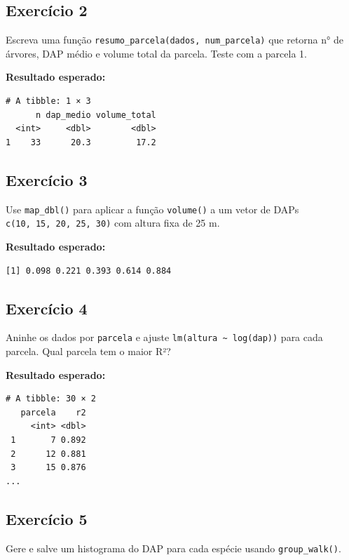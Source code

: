 \documentclass[
  letterpaper,
]{scrbook}
\begin{document}
\subsection{Exercício 2}\label{exercuxedcio-2-13}

Escreva uma função \texttt{resumo\_parcela(dados,\ num\_parcela)} que
retorna n° de árvores, DAP médio e volume total da parcela. Teste com a
parcela 1.

\textbf{Resultado esperado:}

\begin{verbatim}
# A tibble: 1 × 3
      n dap_medio volume_total
  <int>     <dbl>        <dbl>
1    33      20.3         17.2
\end{verbatim}

\subsection{Exercício 3}\label{exercuxedcio-3-12}

Use \texttt{map\_dbl()} para aplicar a função \texttt{volume()} a um
vetor de DAPs \texttt{c(10,\ 15,\ 20,\ 25,\ 30)} com altura fixa de 25
m.

\textbf{Resultado esperado:}

\begin{verbatim}
[1] 0.098 0.221 0.393 0.614 0.884
\end{verbatim}

\subsection{Exercício 4}\label{exercuxedcio-4-9}

Aninhe os dados por \texttt{parcela} e ajuste
\texttt{lm(altura\ \textasciitilde{}\ log(dap))} para cada parcela. Qual
parcela tem o maior R²?

\textbf{Resultado esperado:}

\begin{verbatim}
# A tibble: 30 × 2
   parcela    r2
     <int> <dbl>
 1       7 0.892
 2      12 0.881
 3      15 0.876
...
\end{verbatim}

\subsection{Exercício 5}\label{exercuxedcio-5-5}

Gere e salve um histograma do DAP para cada espécie usando
\texttt{group\_walk()}.
\end{document}
